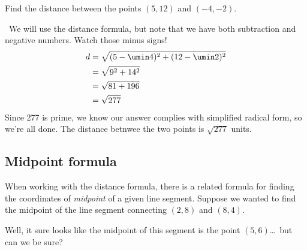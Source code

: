 \begin{boxedex}
Find the distance between the points $(5, 12)$ and $(-4, -2)$.

\exsoln\ We will use the distance formula, but note that we have both subtraction and negative numbers. Watch those minus signs!
\[\begin{aligned}
d &= \sqrt{ (5 - \umin4)^2 + (12 - \umin2)^2 } \\
&= \sqrt{ 9^2 + 14^2 } \\
&=\sqrt{ 81 + 196 } \\
&=\sqrt{ 277 }
\end{aligned}\]
Since 277 is prime, we know our answer complies with simplified radical form, so we're all done. The distance betnwee the two points is $\sqrt{277}$ units.
\end{boxedex}

\subsection{Midpoint formula}

When working with the distance formula, there is a related formula for finding the coordinates of \textit{midpoint} of a given line segment. Suppose we wanted to find the midpoint of the line segment connecting $(2,8)$ and $(8,4)$.
\begin{center}
\end{center}
Well, it sure looks like the midpoint of this segment is the point $(5,6)$\ldots\ but can we be sure?

